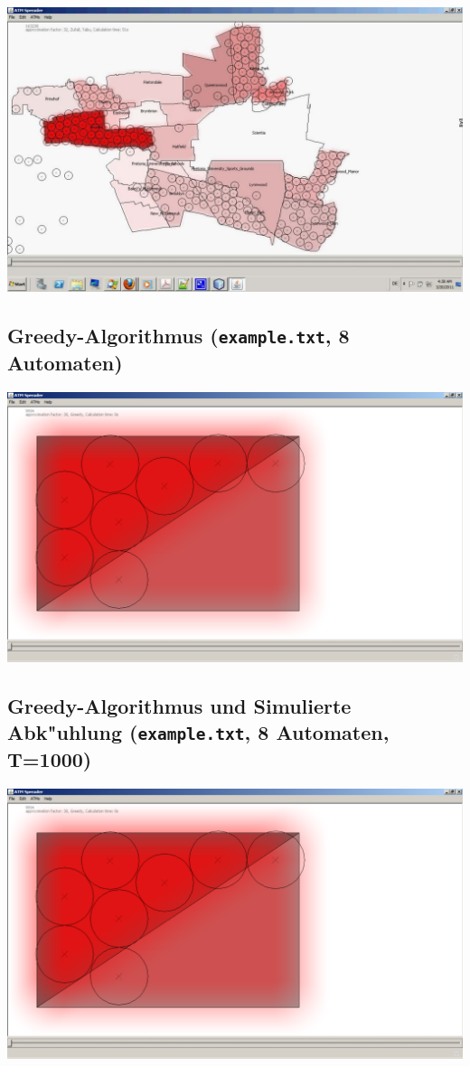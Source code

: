 \documentclass[12pt,a4paper]{article}
\begin{document}
\includegraphics[width=1.0\textwidth]{12.pdf}

\subsection{Greedy-Algorithmus (\texttt{example.txt}, 8 Automaten)}
\includegraphics[width=1.0\textwidth]{ex1_gr.pdf}

\subsection{Greedy-Algorithmus und Simulierte Abk"uhlung (\texttt{example.txt}, 8 Automaten, T=1000)}
\includegraphics[width=1.0\textwidth]{ex1_gr.pdf}
\end{document}
